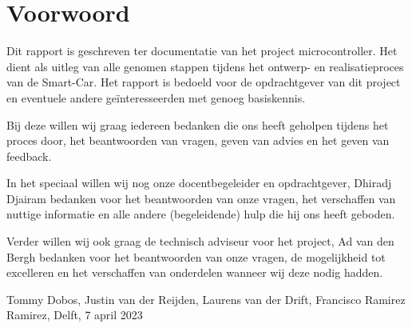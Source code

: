 \section*{Voorwoord}
Dit rapport is geschreven ter documentatie van het project microcontroller. Het dient als uitleg van alle genomen stappen tijdens het ontwerp- en realisatieproces van de \gls{Smart-Car}.  Het rapport is bedoeld voor de opdrachtgever van dit project en eventuele andere geïnteresseerden met genoeg basiskennis. 

Bij deze willen wij graag iedereen bedanken die ons heeft geholpen tijdens het proces door, het beantwoorden van vragen, geven van advies en het geven van feedback. 

In het speciaal willen wij nog onze docentbegeleider en opdrachtgever, Dhiradj Djairam bedanken voor het beantwoorden van onze vragen, het verschaffen van nuttige informatie en alle andere (begeleidende) hulp die hij ons heeft geboden. 

Verder willen wij ook graag de technisch adviseur voor het project, Ad van den Bergh bedanken voor het beantwoorden van onze vragen, de mogelijkheid tot excelleren en het verschaffen van onderdelen wanneer wij deze nodig hadden. 

Tommy Dobos,
Justin van der Reijden,
Laurens van der Drift,
Francisco Ramirez Ramirez,
Delft, 7 april 2023